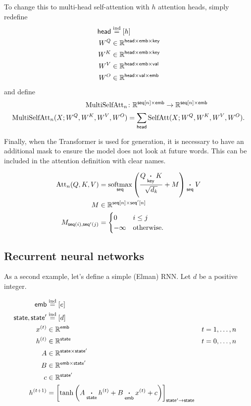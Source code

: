 \documentclass{article}
\newcommand{\reals}{\mathbb{R}}
\begin{document}
To change this to multi-head self-attention with $h$ attention heads, simply redefine 
\begin{align*}
  \name{head} &\ndef [h] \\
  W^Q &\in \mathbb{R}^{\name{head} \times \name{emb} \times \name{key}} \\
  W^K &\in \mathbb{R}^{\name{head} \times \name{emb} \times \name{key}} \\
  W^V &\in \mathbb{R}^{\name{head} \times \name{emb} \times \name{val}} \\
  W^O &\in \mathbb{R}^{\name{head} \times \name{val} \times \name{emb}}
\end{align*}
and define
\begin{align*}
\text{MultiSelfAtt}_n &\colon \mathbb{R}^{\nset{seq}{n} \times\name{emb}} \rightarrow \mathbb{R}^{\nset{seq}{n} \times\name{emb}} \\
\text{MultiSelfAtt}_n(X; W^Q, W^K, W^V, W^O) &= \nsum{head} \text{SelfAtt}(X; W^Q, W^K, W^V, W^O).
\end{align*}

Finally, when the Transformer is used for generation, it is necessary to have
an additional mask to ensure the model does not look at future words.
This can be included in the attention definition with clear names.

\begin{align*} 
\text{Att}_n(Q, K, V) &=  \nfun{seq}{softmax} \left( \frac{Q \ndot{key} K}{\sqrt{d_k}} + M \right) \ndot{seq} V \\
M & \in \reals^{\nset{seq}{n} \times \nset{seq'}{n}} \\
M_{\nidx{seq}{i}, \nidx{seq'}{j}} & = \begin{cases}0 & i \leq j\\
-\infty & \text{otherwise.} \end{cases}
\end{align*}


\subsection{Recurrent neural networks}
\label{sec:rnn}

As a second example, let's define a simple (Elman) RNN. Let $d$ be a positive integer.

\begin{align*}
\name{emb} &\ndef [e] \\
\name{state}, \name{state'} &\ndef [d] \\
x^{(t)} &\in \mathbb{R}^{\name{emb}} & t &= 1, \ldots, n \\
h^{(t)} &\in \mathbb{R}^{\name{state}} & t &= 0, \ldots, n\\
A &\in \mathbb{R}^{\name{state} \times \name{state'}} \\
B &\in \mathbb{R}^{\name{emb} \times \name{state'}} \\
c &\in \mathbb{R}^{\name{state'}} \\
h^{(t+1)} &= \nmov{state'}{state}{\tanh\left( A \ndot{state} h^{(t)} + B \ndot{emb} x^{(t)} + c \right)}
\end{align*}
\end{document}
